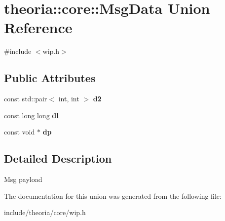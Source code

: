 \hypertarget{uniontheoria_1_1core_1_1MsgData}{}\section{theoria\+:\+:core\+:\+:Msg\+Data Union Reference}
\label{uniontheoria_1_1core_1_1MsgData}


{\ttfamily \#include $<$wip.\+h$>$}

\subsection*{Public Attributes}
\begin{DoxyCompactItemize}
\item 
\mbox{\label{uniontheoria_1_1core_1_1MsgData_a6bdc61f44d3b09181a5b697dcaa9531f}} 
const std\+::pair$<$ int, int $>$ {\bfseries d2}
\item 
\mbox{\label{uniontheoria_1_1core_1_1MsgData_ab64ff11671488ddf8fededca84809692}} 
const long long {\bfseries dl}
\item 
\mbox{\label{uniontheoria_1_1core_1_1MsgData_a9e1249c381a92c9c628564f03cac7dcd}} 
const void $\ast$ {\bfseries dp}
\end{DoxyCompactItemize}


\subsection{Detailed Description}
Msg payload 

The documentation for this union was generated from the following file\+:\begin{DoxyCompactItemize}
\item 
include/theoria/core/wip.\+h\end{DoxyCompactItemize}
